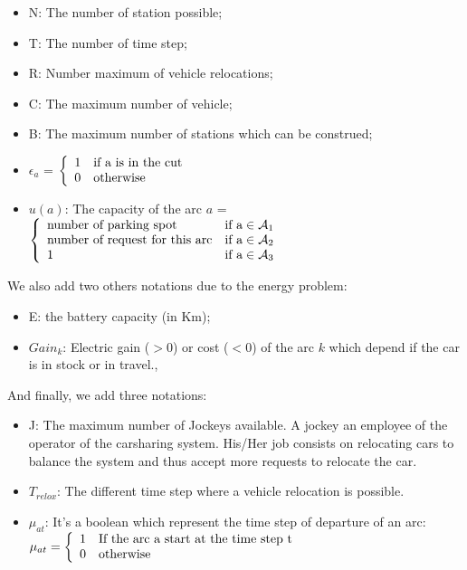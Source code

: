 \begin{bibunit}[ieeetr]
\begin{itemize}
\item N: The number of station possible;
\item T: The number of time step;
\item R: Number maximum of vehicle relocations;
\item C: The maximum  number of vehicle;
\item B: The maximum number of stations which can be construed;
\item $\epsilon_a$ = $\left\{
\begin{array}{l l}
1 & \text{if a is in the cut} \\
0 & \text{otherwise} \\
\end{array}
\right.$
\item $u(a)$: The capacity of the arc $a$ =$\left\{
\begin{array}{l l}
\text{number of parking spot} & \text{if a} \in \mathcal{A}_1\\
\text{number of request for this arc} & \text{if a} \in \mathcal{A}_2\\
1 & \text{if a} \in \mathcal{A}_3\\
\end{array}
\right.$
\end{itemize}

We also add two others notations due to the energy problem:
\begin{itemize}
\item E: the battery capacity (in Km);
\item $Gain_k$: Electric gain ($>0$) or cost ($<0$) of the arc $k$ which depend if the car is in stock or in travel.,
\end{itemize}

And finally, we add three notations: 
\begin{itemize}
\item
J: The maximum number of Jockeys available.
A jockey an employee of the operator of the carsharing system.
His/Her job consists on relocating cars to balance the system and thus accept more requests to relocate the car.
\item
$T_{relox}$: The different time step where a vehicle relocation is possible.
\item
$\mu_{at}$: It's a boolean which represent the time step of departure of an arc:
$\mu_{at} =\left\{
\begin{array}{l l}
1 & \text{If the arc a start at the time step t }\\
0 & \text{otherwise}
\end{array}
\right.$\\
\end{itemize}


\end{bibunit}
